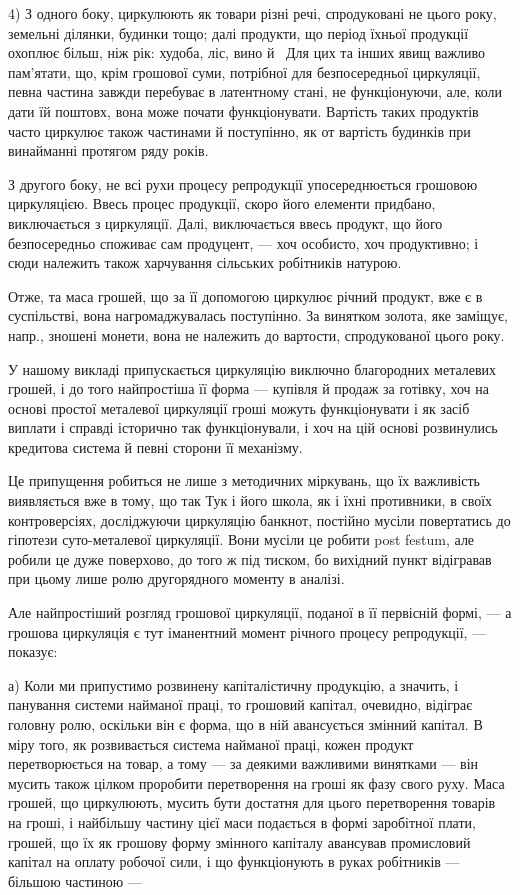 
4) З одного боку, циркулюють як товари різні речі, спродуковані
не цього року, земельні ділянки, будинки тощо; далі продукти, що
період їхньої продукції охоплює більш, ніж рік: худоба, ліс, вино й~
Для цих та інших явищ важливо пам’ятати, що, крім грошової суми,
потрібної для безпосередньої циркуляції, певна частина завжди перебуває
в латентному стані, не функціонуючи, але, коли дати їй поштовх, вона
може почати функціонувати. Вартість таких продуктів часто циркулює
також частинами й поступінно, як от вартість будинків при винайманні
протягом ряду років.

З другого боку, не всі рухи процесу репродукції упосереднюється
грошовою циркуляцією. Ввесь процес продукції, скоро його елементи
придбано, виключається з циркуляції. Далі, виключається ввесь продукт,
що його безпосередньо споживає сам продуцент, — хоч особисто, хоч
продуктивно; і сюди належить також харчування сільських робітників
натурою.

Отже, та маса грошей, що за її допомогою циркулює річний продукт,
вже є в суспільстві, вона нагромаджувалась поступінно. За винятком золота,
яке заміщує, напр., зношені монети, вона не належить до вартости,
спродукованої цього року.

У нашому викладі припускається циркуляцію виключно благородних
металевих грошей, і до того найпростіша її форма — купівля й продаж
за готівку, хоч на основі простої металевої циркуляції гроші можуть
функціонувати і як засіб виплати і справді історично так функціонували,
і хоч на цій основі розвинулись кредитова система й певні сторони
її механізму.

Це припущення робиться не лише з методичних міркувань, що їх важливість
виявляється вже в тому, що так Тук і його школа, як і їхні противники,
в своїх контроверсіях, досліджуючи циркуляцію банкнот, постійно
мусіли повертатись до гіпотези суто-металевої циркуляції. Вони мусіли
це робити post festum, але робили це дуже поверхово, до того ж під
тиском, бо вихідний пункт відігравав при цьому лише ролю другорядного
моменту в аналізі.

Але найпростіший розгляд грошової циркуляції, поданої в її первісній
формі, — а грошова циркуляція є тут іманентний момент річного процесу
репродукції, — показує:

а) Коли ми припустимо розвинену капіталістичну продукцію, а значить,
і панування системи найманої праці, то грошовий капітал, очевидно,
відіграє головну ролю, оскільки він є форма, що в ній авансується
змінний капітал. В міру того, як розвивається система найманої праці,
кожен продукт перетворюється на товар, а тому — за деякими важливими
винятками — він мусить також цілком проробити перетворення на
гроші як фазу свого руху. Маса грошей, що циркулюють, мусить бути
достатня для цього перетворення товарів на гроші, і найбільшу частину
цієї маси подається в формі заробітної плати, грошей, що їх як грошову
форму змінного капіталу авансував промисловий капітал на оплату робочої
сили, і що функціонують в руках робітників — більшою частиною —
\parbreak{}  %
